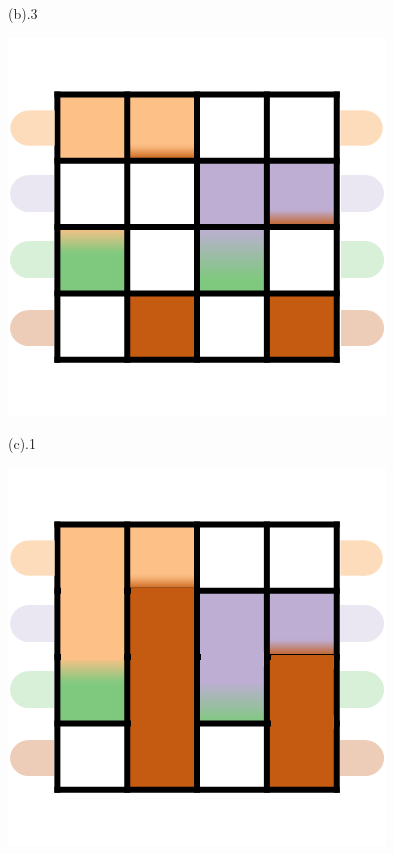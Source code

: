 \documentclass[review,journal]{vgtc}         %
\begin{document}
\begin{figure}[h]
\begin{minipage}{0.24\linewidth}
		\vspace{-1pt}
		\centerline{(b).3}
	\end{minipage}
	\begin{minipage}{0.24\linewidth}
		\centerline{\includegraphics[width=\textwidth]{Fig/31.png}}
		\vspace{-1pt}
		\centerline{(c).1}
		\centerline{\includegraphics[width=\textwidth]{Fig/32.png}}

\end{minipage}
\end{figure}
\end{document}
